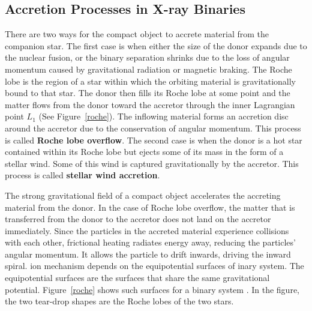 \subsection{Accretion Processes in X-ray Binaries}
There are two ways for the compact object to accrete material from the companion star. The first case is when either the size of the donor expands due to the nuclear fusion, or the binary separation shrinks due to the loss of angular momentum caused by gravitational radiation or magnetic braking. The Roche lobe is the region of a star within which the orbiting material is gravitationally bound to that star. The donor then fills its Roche lobe at some point and the matter flows from the donor toward the accretor through the inner Lagrangian point $L_1$ (See Figure~\ref{roche}). The inflowing material forms an accretion disc around the accretor due to the conservation of angular momentum. This process is called \textbf{Roche lobe overflow}. The second case is when the donor is a hot star contained within its Roche lobe but ejects some of its mass in the form of a stellar wind. Some of this wind is captured gravitationally by the accretor. This process is called \textbf{stellar wind accretion}.\par


The strong gravitational field of a compact object accelerates the accreting material from the donor. In the case of Roche lobe overflow, the matter that is transferred from the donor to the accretor does not land on the accretor immediately. Since the particles in the accreted material experience collisions with each other, frictional heating radiates energy away, reducing the particles' angular momentum. It allows the particle to drift inwards, driving the inward spiral. ion mechanism depends on the equipotential surfaces of inary system. The equipotential surfaces are the surfaces that share the same gravitational potential. Figure~\ref{roche} shows such surfaces for a binary system \citep{Ruffini1975}. In the figure, the two tear-drop shapes are the Roche lobes of the two stars. \par

